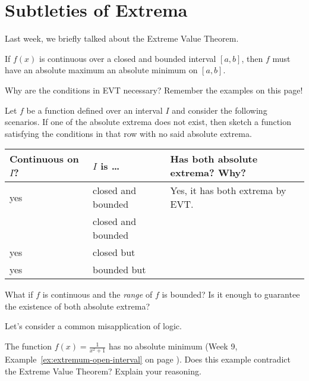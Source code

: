 \documentclass[../main.tex]{subfiles}
\begin{document}
 \section{Subtleties of Extrema}
  Last week, we briefly talked about the Extreme Value Theorem.
  \begin{mdframed}[style=withref-compact]
    If \(f(x)\) is continuous over a closed and bounded interval \([a,b]\), then \(f\) must have an absolute maximum  an absolute minimum on \([a,b]\).

  \end{mdframed}

  Why are the conditions  in EVT necessary? Remember the examples on this page!

  \begin{example}
    Let \(f\) be a function defined over an interval \(I\) and consider the following scenarios. If one of the absolute extrema does not exist, then sketch a function satisfying the conditions in that row with no said absolute extrema.

    \begin{center}
      \begin{tabular}{p{1in}|l|p{4in}}
        \parbox{1in}{Continuous\\on \(I\)?} & \(I\) is \ldots{} & Has both absolute extrema? Why? \\ \midrule
        yes & closed and bounded & Yes, it has both extrema by EVT. \\\midrule
         & closed and bounded & \\[1in] \midrule
        yes & closed but  & \\[1in] \midrule
        yes & bounded but  & \\[1in]
      \end{tabular}
    \end{center}

    \faComment{} What if \(f\) is continuous and the \emph{range} of \(f\) is bounded? Is it enough to guarantee the existence of both absolute extrema? 

  \end{example}

  \medskip{}
  Let's consider a common misapplication of logic.
  \begin{example}
    The function \(f(x) = \frac{1}{x^{2} + 1}\) has no absolute minimum (Week 9, Example~\ref{ex:extremum-open-interval} on page \pageref{ex:extremum-open-interval}). Does this example contradict the Extreme Value Theorem? Explain your reasoning.
    \vfill{}
    \clearpage
  \end{example}
\end{document}
